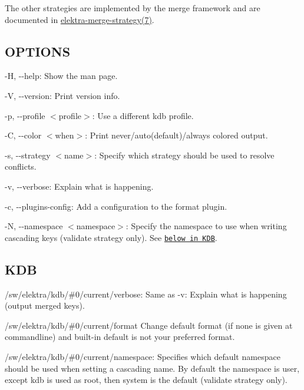The other strategies are implemented by the merge framework and are documented in \hyperlink{doc_help_elektra-merge-strategy_md}{elektra-\/merge-\/strategy(7)}.

\subsection*{O\+P\+T\+I\+O\+NS}


\begin{DoxyItemize}
\item {\ttfamily -\/H}, {\ttfamily -\/-\/help}\+: Show the man page.
\item {\ttfamily -\/V}, {\ttfamily -\/-\/version}\+: Print version info.
\item {\ttfamily -\/p}, {\ttfamily -\/-\/profile $<$profile$>$}\+: Use a different kdb profile.
\item {\ttfamily -\/C}, {\ttfamily -\/-\/color $<$when$>$}\+: Print never/auto(default)/always colored output.
\item {\ttfamily -\/s}, {\ttfamily -\/-\/strategy $<$name$>$}\+: Specify which strategy should be used to resolve conflicts.
\item {\ttfamily -\/v}, {\ttfamily -\/-\/verbose}\+: Explain what is happening.
\item {\ttfamily -\/c}, {\ttfamily -\/-\/plugins-\/config}\+: Add a configuration to the format plugin.
\item {\ttfamily -\/N}, {\ttfamily -\/-\/namespace $<$namespace$>$}\+: Specify the namespace to use when writing cascading keys ({\ttfamily validate} strategy only). See \href{#KDB}{\tt below in K\+DB}.
\end{DoxyItemize}

\subsection*{K\+DB}


\begin{DoxyItemize}
\item {\ttfamily /sw/elektra/kdb/\#0/current/verbose}\+: Same as {\ttfamily -\/v}\+: Explain what is happening (output merged keys).
\item {\ttfamily /sw/elektra/kdb/\#0/current/format} Change default format (if none is given at commandline) and built-\/in default is not your preferred format.
\item {\ttfamily /sw/elektra/kdb/\#0/current/namespace}\+: Specifies which default namespace should be used when setting a cascading name. By default the namespace is user, except {\ttfamily kdb} is used as root, then {\ttfamily system} is the default ({\ttfamily validate} strategy only).
\end{DoxyItemize}

